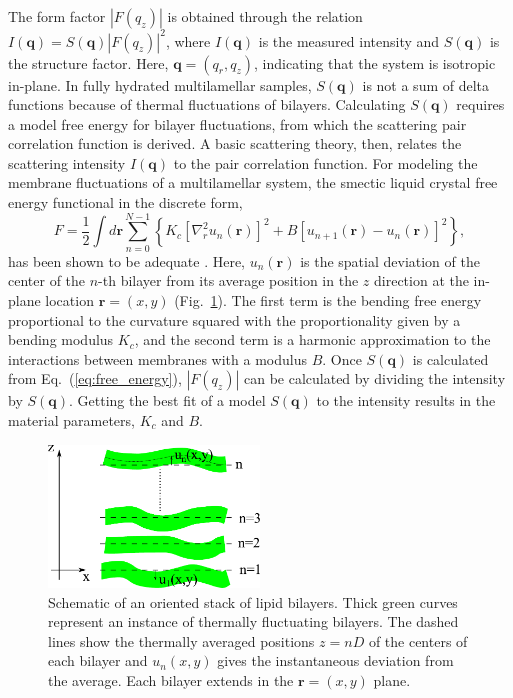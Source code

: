 The form factor $|F(q_z)|$ is obtained through the relation
$I(\mathbf{q})= S(\mathbf{q})|F(q_z)|^2$, where $I(\mathbf{q})$ is the 
measured intensity and $S(\mathbf{q})$ is the structure factor.
Here, $\mathbf{q} = (q_r, q_z)$, indicating that the system is isotropic in-plane. 
In fully hydrated multilamellar samples, $S(\mathbf{q})$ is not a sum of delta 
functions because of thermal fluctuations of bilayers. Calculating $S(\mathbf{q})$
requires a model free energy for bilayer fluctuations, from which the scattering
pair correlation function is derived. A basic scattering theory, then, relates
the scattering intensity $I(\mathbf{q})$ to the pair correlation function. 
For modeling the membrane fluctuations of a multilamellar system, 
the smectic liquid crystal free energy functional in the discrete form,
\begin{equation}
  F=\frac{1}{2}\int d\mathbf{r}\sum _{n=0}^{N-1}\left\{ 
  K_{c} \left[\nabla _{r}^{2}u_{n}\left(\mathbf{r}\right)\right]^{2}
  +B\left[u_{n+1}\left(\mathbf{r}\right)-u_{n}\left(\mathbf{r}\right)\right]^{2}
  \right\},
  \label{eq:free_energy}
\end{equation}
has been shown to be adequate \cite{Lyatskaya01}.
Here, $u_{n}\left(\mathbf{r}\right)$ is the spatial deviation of the center 
of the $n$-th bilayer from its average position in the $z$ direction
at the in-plane location $\mathbf{r}=(x,y)$ (Fig.~\ref{fig:stack}).
The first term is the bending free energy proportional to the curvature
squared with the proportionality given by a bending modulus $K_{c}$, and
the second term is a harmonic approximation to the interactions between
membranes with a modulus $B$. 
Once $S(\mathbf{q})$ is calculated 
from Eq.~(\ref{eq:free_energy}), $|F(q_z)|$ can 
be calculated by dividing the intensity by $S(\mathbf{q})$. 
Getting the best fit of a model $S(\mathbf{q})$ to the intensity results in 
the material parameters, $K_c$ and $B$.

\begin{figure}[htbp]
  \centering
  \includegraphics[width=0.5\textwidth]{figures/Tat/MMs/stack}
  \caption[Schematic of an oriented stack of lipid bilayers]
  {Schematic of an oriented stack of lipid bilayers. Thick green curves
  represent an instance of thermally fluctuating bilayers. The dashed lines 
  show the thermally averaged positions $z=nD$ of the centers of each bilayer 
  and $u_{n}(x,y)$ gives the instantaneous deviation from the average. 
  Each bilayer extends in the $\mathbf{r}=\left(x,y\right)$ plane.}
  \label{fig:stack}
\end{figure}

